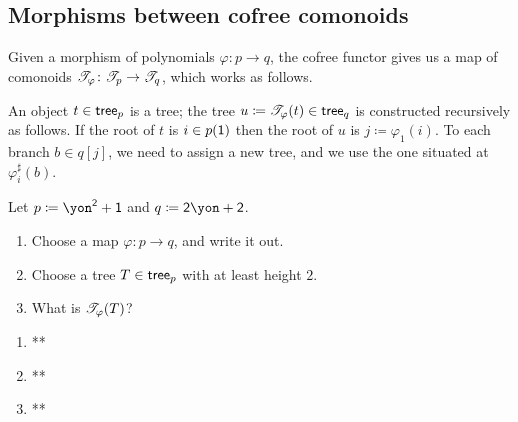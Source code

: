\documentclass[Book-Poly]{subfiles}
\begin{document}



\subsection{Morphisms between cofree comonoids}
Given a morphism of polynomials $\varphi \colon p \to q$, the cofree functor gives us a map of comonoids $\mathscr{T}_{\varphi} \colon \mathscr{T}_{p} \to \mathscr{T}_{q}$, which works as follows.

An object $t \in \mathsf{tree}_p$ is a tree; the tree $u \coloneqq \mathscr{T}_{\varphi} (t) \in \mathsf{tree}_q $ is constructed recursively as follows. If the root of $t$ is $i \in p(\textsf{1})$ then the root of $u$ is $j \coloneqq \varphi_1 (i)$. To each branch $b \in q[j]$, we need to assign a new tree, and we use the one situated at $\varphi_i ^ \sharp (b)$.

\begin{exercise}
Let $p \coloneqq \yon ^\2 + \1$ and $q \coloneqq \2 \yon + \2$.
\begin{enumerate}
    \item Choose a map $\varphi\colon p\to q$, and write it out.
    \item Choose a tree $T\in\mathsf{tree}_p$ with at least height $2$.
    \item What is $\mathscr{T}_{\varphi}(T)$?
    \qedhere
\end{enumerate}
\begin{solution}
\begin{enumerate}
    \item **
    \item **
    \item **
\end{enumerate}
\end{solution}
\end{exercise}
\end{document}
